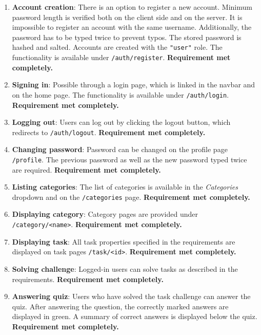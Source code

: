 \begin{enumerate}
	\item \textbf{Account creation}: There is an option to register a new account. Minimum password length is verified both on the client side and on the server. It is impossible to register an account with the same username. Additionally, the password has to be typed twice to prevent typos. The stored password is hashed and salted. Accounts are created with the \texttt{"user"} role. The functionality is available under \texttt{/auth/register}. \textbf{Requirement met completely.}

	\item \textbf{Signing in}: Possible through a login page, which is linked in the navbar and on the home page. The functionality is available under \texttt{/auth/login}. \textbf{Requirement met completely.}

	\item \textbf{Logging out}: Users can log out by clicking the logout button, which redirects to \texttt{/auth/logout}. \textbf{Requirement met completely.}

	\item \textbf{Changing password}: Password can be changed on the profile page \texttt{/profile}. The previous password as well as the new password typed twice are required. \textbf{Requirement met completely.}

	\item \textbf{Listing categories}: The list of categories is available in the \textit{Categories} dropdown and on the \texttt{/categories} page. \textbf{Requirement met completely.}

	\item \textbf{Displaying category}: Category pages are provided under \texttt{/category/<name>}. \textbf{Requirement met completely.}

	\item \textbf{Displaying task}: All task properties specified in the requirements are displayed on task pages \texttt{/task/<id>}. \textbf{Requirement met completely.}

	\item \textbf{Solving challenge}: Logged-in users can solve tasks as described in the requirements. \textbf{Requirement met completely.}

	\item \textbf{Answering quiz}: Users who have solved the task challenge can answer the quiz. After answering the question, the correctly marked answers are displayed in green. A summary of correct answers is displayed below the quiz. \textbf{Requirement met completely.}


\end{enumerate}
